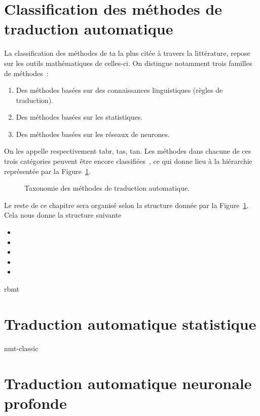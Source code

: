 \section{Classification des méthodes de traduction automatique}

La classification des méthodes de \acrshort{ta} la plus citée à travers la littérature, 
repose sur les outils mathématiques de celles-ci.
On distingue notamment trois familles de méthodes~\cite{deep-nmt-survey}:
\begin{enumerate}
    \item Des méthodes basées sur des connaissances linguistiques (règles de traduction).
    \item Des méthodes basées sur les statistiques.
    \item Des méthodes basées sur les réseaux de neurones.
\end{enumerate}

On les appelle respectivement \Acrfull{tabr}, \Acrfull{tas}, \Acrfull{tan}.
Les méthodes dans chacune de ces trois catégories peuvent être encore classifiées~\cite{deep-nmt-survey,hybrid-mt},
ce qui donne lieu à la hiérarchie représentée par la Figure~\ref{fig:mt-taxonomy-tree}.

\begin{figure}
    \begin{center}
       \resizebox{\textwidth}{!}{
         
       }
    \end{center}
    
    \caption{Taxonomie des méthodes de traduction automatique.}
    \label{fig:mt-taxonomy-tree}
\end{figure}

Le reste de ce chapitre sera organisé selon la structure donnée par la Figure~\ref{fig:mt-taxonomy-tree}. 
Cela nous donne la structure suivante

\begin{itemize}
    \item {}
    \item {}
    \item {}
    \item {}
    \item {}
\end{itemize}

{rbmt}
\section{Traduction automatique statistique}
\label{sec:smt}
{nmt-classic}
\section{Traduction automatique neuronale profonde}
\label{sec:dnmt}
